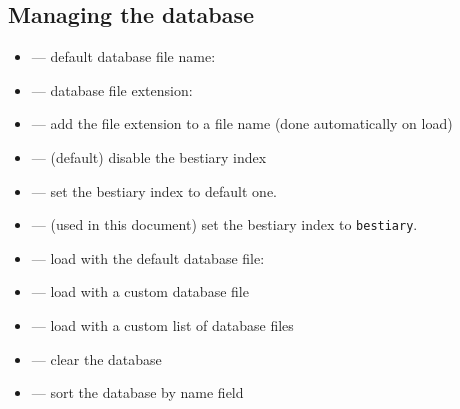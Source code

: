 \documentclass[itdr]{subfiles}
\begin{document}
\vfill
\clearpage

\noindent\begin{minipage}{\textwidth}
\subsection{Managing the database}

\begin{itemize}
	\item \fbox{\lstinline!\\bestiaryDefault!} --- default database file name: 
	\item \fbox{\lstinline!\\bestiaryExtension!} --- database file extension: 
	\item {} --- add the file extension to a file name (done automatically on load)
	\item \fbox{\lstinline!\\def\\bestiaryIndex\{\}!} --- (default) disable the bestiary index
	\item \fbox{\lstinline!\\def\\bestiaryIndex\{\\jobname\}!} --- set the bestiary index to default one.
	\item {} --- (used in this document) set the bestiary index to \lstinline!bestiary!.
	\item {} --- load with the default database file: 
	\item {} --- load with a custom database file
	\item {} --- load with a custom list of database files
	\item \fbox{\lstinline!\\bestiaryClear!} --- clear the database
	\item \fbox{\lstinline!\\bestiarySort!} --- sort the database by name field

\end{itemize}
\end{minipage}
\end{document}
